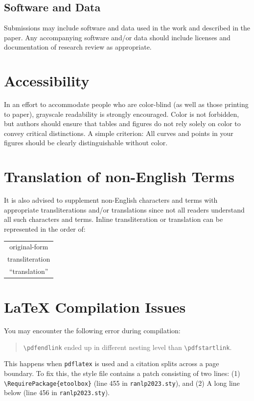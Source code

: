 \documentclass[11pt,a4paper]{article}
\begin{document}
\subsection{Software and Data}
\label{sec:software_and_data}
Submissions may include software and data used in the work and described in the paper.
Any accompanying software and/or data should include licenses and documentation of research review as appropriate.

\section{Accessibility}
\label{ssec:accessibility}

In an effort to accommodate people who are color-blind (as well as those printing to paper), grayscale readability is strongly encouraged.
Color is not forbidden, but authors should ensure that tables and figures do not rely solely on color to convey critical distinctions.
A simple criterion:
All curves and points in your figures should be clearly distinguishable without color.

\section{Translation of non-English Terms}

It is also advised to supplement non-English characters and terms with appropriate transliterations and/or translations since not all readers understand all such characters and terms.
Inline transliteration or translation can be represented in the order of:
\begin{center}
\begin{tabular}{c}
original-form \\
transliteration \\
``translation''
\end{tabular}
\end{center}

\section{\LaTeX{} Compilation Issues}
You may encounter the following error during compilation: 
\begin{quote}
{\small\verb|\pdfendlink|} ended up in different nesting level than {\small\verb|\pdfstartlink|}.
\end{quote}
This happens when \texttt{\small pdflatex} is used and a citation splits across a page boundary.
To fix this, the style file contains a patch consisting of two lines:
(1) {\small\verb|\RequirePackage{etoolbox}|} (line 455 in \texttt{\small ranlp2023.sty}), and
(2) A long line below (line 456 in \texttt{\small ranlp2023.sty}).
\end{document}
